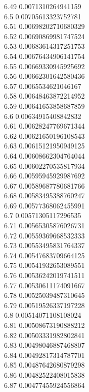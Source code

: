 {6.49	0.0071310264941159\\
6.5	0.00705613323752781\\
6.51	0.00698202710680329\\
6.52	0.00690869981747524\\
6.53	0.00683614317251753\\
6.54	0.00676434906141754\\
6.55	0.00669330945925692\\
6.56	0.00662301642580436\\
6.57	0.0065534621046167\\
6.58	0.00648463872214952\\
6.59	0.00641653858687859\\
6.6	0.00634915408842832\\
6.61	0.00628247769671344\\
6.62	0.00621650196108543\\
6.63	0.00615121950949125\\
6.64	0.00608662304764044\\
6.65	0.00602270535817934\\
6.66	0.00595945929987692\\
6.67	0.00589687780681766\\
6.68	0.00583495388760247\\
6.69	0.00577368062455991\\
6.7	0.00571305117296535\\
6.71	0.00565305876026731\\
6.72	0.00559369668532333\\
6.73	0.00553495831764337\\
6.74	0.00547683709664125\\
6.75	0.00541932653089551\\
6.76	0.00536242019741511\\
6.77	0.00530611174091667\\
6.78	0.00525039487310645\\
6.79	0.00519526337197228\\
6.8	0.00514071108108024\\
6.81	0.00508673190888212\\
6.82	0.00503331982802841\\
6.83	0.00498046887468807\\
6.84	0.00492817314787701\\
6.85	0.00487642680879298\\
6.86	0.00482522408015838\\
6.87	0.00477455924556864\\
}
